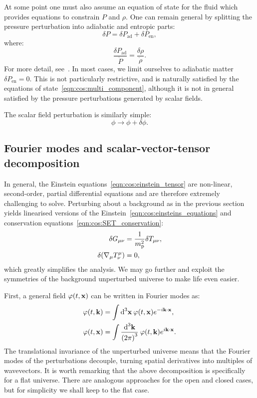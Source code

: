 At some point one must also assume an equation of state for the fluid which provides equations to constrain \(P\) and \(\rho\). One can remain general by splitting the pressure perturbation into adiabatic and entropic parts:
\begin{equation}
  \delta P = \delta P_\mathrm{ad} + \delta P_\mathrm{en},
  \label{eqn:cos:adiabatic_entropic}
\end{equation} 
where:
\begin{equation}
  \frac{\delta P_\mathrm{ad}}{\dot{P}} = \frac{\delta\rho}{\dot{\rho}}.
  \label{eqn:cos:adiabatic}
\end{equation} 
For more detail, see~\citet[p.~48]{Baumann+2009}. 
In most cases, we limit ourselves to adiabatic matter \(\delta P_\mathrm{en}=0\).
This is not particularly restrictive, and is naturally satisfied by the equations of state~\eqref{eqn:cos:multi_component}, although it is not in general satisfied by the pressure perturbations generated by scalar fields.

The scalar field perturbation is similarly simple:
\begin{equation}
  \phi \rightarrow \phi + \delta\phi.
\end{equation}

\subsection{Fourier modes and scalar-vector-tensor decomposition}
In general, the Einstein equations~\eqref{eqn:cos:einstein_tensor} are non-linear, second-order, partial differential equations and are therefore extremely challenging to solve. Perturbing about a background as in the previous section yields linearised versions of the Einstein~\eqref{eqn:cos:einsteins_equations} and conservation equations~\eqref{eqn:cos:SET_conservation}:
\begin{align}
  \delta G_{\mu\nu} &= \frac{1}{\m^2}\delta T_{\mu\nu},
  \label{eqn:cos:einsteins_equations_perturb} \\
  \delta (\nabla_\mu T^{\mu}_{\nu}) &=0,
  \label{eqn:cos:SET_conservation_perturb}
\end{align}
which greatly simplifies the analysis.  
We may go further and exploit the symmetries of the background unperturbed universe to make life even easier.

First, a general field \(\varphi(t,\vx)\) can be written in Fourier modes as:
\begin{align}
  \varphi(t,\vk) &= \int \d[3]{\vx}\: \varphi(t,\vx) e^{-i\vk \cdot \vx},\\
  \varphi(t,\vx) &= \int \frac{\d[3]{\vk}}{{(2\pi)}^3}\: \varphi(t,\vk) e^{i\vk \cdot \vx}.
\end{align}
The translational invariance of the unperturbed universe means that the Fourier modes of the perturbations decouple, turning spatial derivatives into multiples of wavevectors. 
It is worth remarking that the above decomposition is specifically for a flat universe. There are analogous approaches for the open and closed cases, but for simplicity we shall keep to the flat case. 

